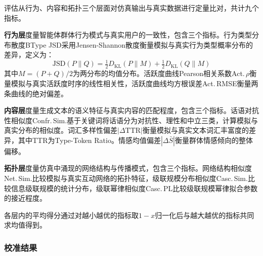 \documentclass[a4paper,fleqn]{cas-sc}
\begin{document}
评估从行为、内容和拓扑三个层面对仿真输出与真实数据进行定量比对，共计九个指标。

\textbf{行为层}度量智能体群体行为模式与真实用户的一致性，包含三个指标。行为类型分布散度BType JSD采用Jensen-Shannon散度衡量模拟与真实行为类型概率分布的差异，定义为：
\begin{equation}
\text{JSD}(P \| Q) = \tfrac{1}{2} D_{\text{KL}}(P \| M) + \tfrac{1}{2} D_{\text{KL}}(Q \| M)
\end{equation}
其中$M = (P + Q)/2$为两分布的均值分布。活跃度曲线Pearson相关系数Act.\,$\rho$衡量模拟与真实活跃度时序的线性相关性，活跃度曲线均方根误差Act.\,RMSE衡量两条曲线的绝对偏差。

\textbf{内容层}度量生成文本的语义特征与真实内容的匹配程度，包含三个指标。话语对抗性相似度Confr.\,Sim.基于关键词将话语分为对抗性、理性和中立三类，计算模拟与真实分布的相似度。词汇多样性偏差$|\Delta\text{TTR}|$衡量模拟与真实文本词汇丰富度的差异，其中TTR为Type-Token Ratio。情感均值偏差$|\Delta\bar{S}|$衡量群体情感倾向的整体偏移。

\textbf{拓扑层}度量仿真中涌现的网络结构与传播模式，包含三个指标。网络结构相似度Net.\,Sim.比较模拟与真实互动网络的拓扑特征，级联规模分布相似度Casc.\,Sim.比较信息级联规模的统计分布，级联幂律相似度Casc.\,PL比较级联规模幂律拟合参数的接近程度。

各层内的平均得分通过对越小越优的指标取$1{-}x$归一化后与越大越优的指标共同求均值得到。

\subsubsection{校准结果}
\end{document}

